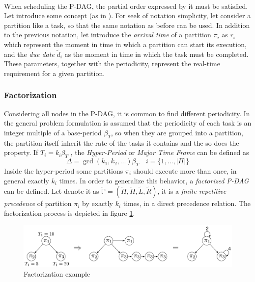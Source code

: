 \paragraph{} When scheduling the P-DAG, the partial order expressed by it must be satisfied. Let introduce some concept (as in \cite{blazewiczScheduling}). For seek of notation simplicity, let consider a partition like a task, so that the same notation as before can be used. In addition to the previous notation, let introduce the \emph{arrival time} of a partition $\pi_i$ as $r_i$ which represent the moment in time in which a partition can start its execution, and the \emph{due date} $\widetilde{d}_i$ as the moment in time in which the task must be completed. These parameters, together with the periodicity, represent the real-time requirement for a given partition.

\subsubsection{Factorization}
Considering all nodes in the P-DAG, it is common to find different periodicity. In the general problem formulation is assumed that the periodicity of each task is an integer multiple of a base-period $\beta_T$, so when they are grouped into a partition, the partition itself inherit the rate of the tasks it contains and the so does the property. If $T_i=k_i\beta_T$ , the \emph{Hyper-Period} or \emph{Major Time Frame} can be defined as
\begin{equation}
\Delta = \gcd(k_1,k_2,...)\beta_T\quad i=\{1,...,|\Pi|\}
\end{equation}
Inside the hyper-period some partitions $\pi_i$ should execute more than once, in general exactly $k_i$ times. In order to generalize this behavior, a \emph{factorized P-DAG} can be defined. Let denote it as $\widetilde{\mathbb{P}}=(\widetilde{\Pi},\widetilde{H},\widetilde{L},\widetilde{R})$, it is a \emph{finite repetitive precedence} of partition $\pi_i$ by exactly $k_i$ times, in a direct precedence relation. The factorization process is depicted in figure \ref{fig:Factorization}.

\begin{figure}[htbp] 
\centering    
\includegraphics[width=1.0\textwidth]{Factorization}
\caption{Factorization example}
\label{fig:Factorization}
\end{figure}

